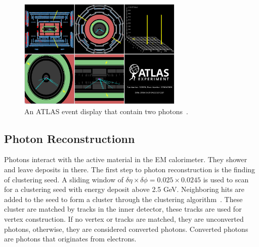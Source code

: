 \begin{figure}[!htb]
    \begin{center}
        \includegraphics[width=0.7\textwidth]{figures/common_ana/photonEvent}
        \caption{        
        An ATLAS event display that contain two photons~\cite{atlas}.
        }
        \label{fig:photonEvent}
    \end{center}
\end{figure}

\subsection{Photon Reconstructionn}
Photons interact with the active material in the EM calorimeter. They shower and leave deposits in there. The first step to photon reconstruction is the finding of clustering seed. A sliding window of $\delta \eta \times \delta \phi = 0.025 \times 0.0245$ is used to scan for a clustering seed with energy deposit above 2.5 GeV. Neighboring hits are added to the seed to form a cluster through the clustering algorithm~\cite{Lampl:1099735}. 
These cluster are matched by tracks in the inner detector, these tracks are used for vertex construction. If no vertex or tracks are matched, they are unconverted photons, otherwise, they are considered converted photons. Converted photons are photons that originates from electrons. 



